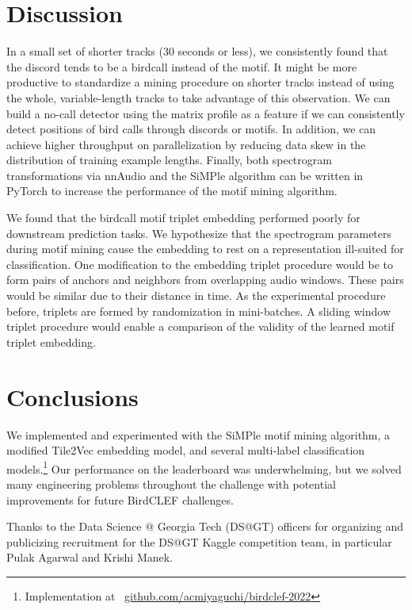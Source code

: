 \documentclass[
]{ceurart}
\begin{document}
\section{Discussion}

In a small set of shorter tracks (30 seconds or less), we consistently found that the discord tends to be a birdcall instead of the motif. It might be more productive to standardize a mining procedure on shorter tracks instead of using the whole, variable-length tracks to take advantage of this observation. We can build a no-call detector using the matrix profile as a feature if we can consistently detect positions of bird calls through discords or motifs. In addition, we can achieve higher throughput on parallelization by reducing data skew in the distribution of training example lengths. Finally, both spectrogram transformations via nnAudio and the SiMPle algorithm can be written in PyTorch to increase the performance of the motif mining algorithm.

We found that the birdcall motif triplet embedding performed poorly for downstream prediction tasks. We hypothesize that the spectrogram parameters during motif mining cause the embedding to rest on a representation ill-suited for classification. One modification to the embedding triplet procedure would be to form pairs of anchors and neighbors from overlapping audio windows. These pairs would be similar due to their distance in time. As the experimental procedure before, triplets are formed by randomization in mini-batches. A sliding window triplet procedure would enable a comparison of the validity of the learned motif triplet embedding.

\section{Conclusions}

We implemented and experimented with the SiMPle motif mining algorithm, a modified Tile2Vec embedding model, and several multi-label classification models.\footnote{Implementation at \
\href{https://github.com/acmiyaguchi/birdclef-2022}{github.com/acmiyaguchi/birdclef-2022}}
Our performance on the leaderboard was underwhelming, but we solved many engineering problems throughout the challenge with potential improvements for future BirdCLEF challenges.

\begin{acknowledgments}
Thanks to the Data Science @ Georgia Tech (DS@GT) officers for organizing and publicizing recruitment for the DS@GT Kaggle competition team, in particular Pulak Agarwal and Krishi Manek.
\end{acknowledgments}


\appendix
\end{document}
